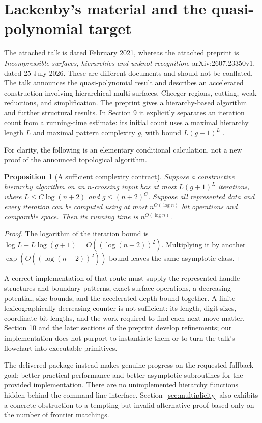 \documentclass[11pt]{article}
\newtheorem{proposition}[theorem]{Proposition}
\theoremstyle{remark}\newtheorem{remark}[theorem]{Remark}
\begin{document}
\section{Lackenby's material and the quasi-polynomial target}
\label{sec:lackenby}
The attached talk is dated February 2021, whereas the attached preprint is
\emph{Incompressible surfaces, hierarchies and unknot recognition},
arXiv:2607.23350v1, dated 25 July 2026. These are different documents and should
not be conflated. The talk announces the quasi-polynomial result and describes
an accelerated construction involving hierarchical multi-surfaces, Cheeger
regions, cutting, weak reductions, and simplification. The preprint gives a
hierarchy-based algorithm and further structural results. In Section 9 it
explicitly separates an iteration count from a running-time estimate: its
initial count uses a maximal hierarchy length $L$ and maximal pattern
complexity $g$, with bound $L(g+1)^L$ \cite{LackenbyTalk,Lackenby2026}.

For clarity, the following is an elementary conditional calculation, not a
new proof of the announced topological algorithm.
\begin{proposition}[A sufficient complexity contract]
Suppose a constructive hierarchy algorithm on an $n$-crossing input has at most
$L(g+1)^L$ iterations, where $L\le C\log(n+2)$ and $g\le(n+2)^C$.
Suppose all represented data and every iteration can be computed using at most
$n^{O(\log n)}$ bit operations and comparable space. Then its running time is
$n^{O(\log n)}$.
\end{proposition}
\begin{proof}
The logarithm of the iteration bound is
$\log L+L\log(g+1)=O((\log(n+2))^2)$. Multiplying it by another
$\exp(O((\log(n+2))^2))$ bound leaves the same asymptotic class.
\end{proof}

A correct implementation of that route must supply the represented handle
structures and boundary patterns, exact surface operations, a decreasing
potential, size bounds, and the accelerated depth bound together. A finite
lexicographically decreasing counter is not sufficient: its length, digit
sizes, coordinate bit lengths, and the work required to find each next move
matter. Section 10 and the later sections of the preprint develop refinements;
our implementation does not purport to instantiate them or to turn the talk's
flowchart into executable primitives.

The delivered package instead makes genuine progress on the requested fallback
goal: better practical performance and better asymptotic subroutines for the
provided implementation. There are no unimplemented hierarchy functions hidden
behind the command-line interface. Section~\ref{sec:multiplicity} also exhibits
a concrete obstruction to a tempting but invalid alternative proof based only
on the number of frontier matchings.
\end{document}
